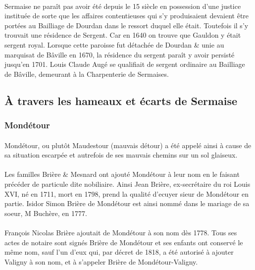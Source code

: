 \documentclass[../eBook.tex]{subfiles}
\begin{document}
      \paragraph{}Sermaise ne paraît pas avoir été depuis le 15 siècle en possession d'une justice instituée de sorte que les affaires contentieuses qui s'y produisaient devaient être portées au Bailliage de Dourdan dans le ressort duquel elle était. Toutefois il s'y trouvait une résidence de Sergent. Car en 1640 on trouve que Gauldon y était sergent royal. Lorsque cette paroisse fut détachée de Dourdan \& unie au marquisat de Bâville en 1670, la résidence du sergent paraît y avoir persisté jusqu'en 1701. Louis Claude Augé se qualifiait de sergent ordinaire au Bailliage de Bâville, demeurant à la Charpenterie de Sermaises.

  \subsection*{À travers les hameaux et écarts de Sermaise}
    \subsubsection*{Mondétour}
      \paragraph{}Mondétour, ou plutôt Maudestour (mauvais détour) a été appelé ainsi à cause de sa situation escarpée et autrefois de ses mauvais chemins sur un sol glaiseux.
      \paragraph{}Les familles Brière \& Mesnard ont ajouté Mondétour à leur nom en le faisant précéder de particule dite nobiliaire. Ainsi Jean Brière, ex-secrétaire du roi Louis XVI, né en 1711, mort en 1798, prend la qualité d'ecuyer sieur de Mondétour en partie. Isidor Simon Brière de Mondétour est ainsi nommé dans le mariage de sa soeur, M Buchère, en 1777.
      \paragraph{}François Nicolas Brière ajoutait de Mondétour à son nom dès 1778. Tous ses actes de notaire sont signés Brière de Mondétour et ses enfants ont conservé le même nom, sauf l'un d'eux qui, par décret de 1818, a été autorisé à ajouter Valigny à son nom, et à s'appeler Brière de Mondétour-Valigny.
\end{document}
